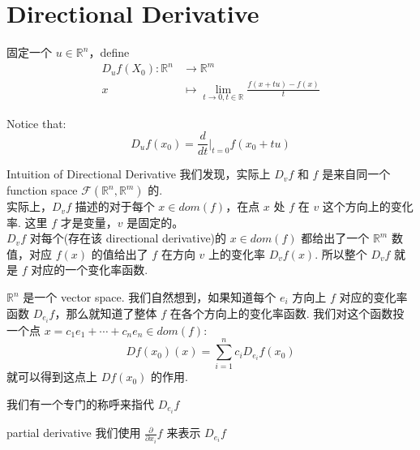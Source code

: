 \section{Directional Derivative}
\begin{definition}
    固定一个 $u \in \mathbb{R}^n$，define 
    \begin{align}
        D_u f(X_0) : \mathbb{R}^n & \rightarrow \mathbb{R}^m\\
        x & \mapsto \lim_{t\rightarrow 0, t\in \mathbb{R}} \frac{f(x + tu) - f(x)}{t}
    \end{align}

        Notice that:
        $$
        D_u f(x_0) = \frac{d}{dt}\bigg| _{t=0} f(x_0 + tu)
        $$
\end{definition}


\begin{proposition}{Intuition of Directional Derivative}
我们发现，实际上 $D_v f$ 和 $f$ 是来自同一个 function space $\mathcal{F}(\mathbb{R}^n, \mathbb{R}^m)$ 的.\\
实际上，$D_v f$ 描述的对于每个 $x \in dom(f)$，在点 $x$ 处 $f$ 在 $v$ 这个方向上的变化率. 这里 $f$ 才是变量，$v$ 是固定的。\\
$D_v f$ 对每个(存在该 directional derivative)的 $x \in dom(f)$ 都给出了一个 $\mathbb{R}^m$ 数值，对应 $f(x)$ 的值给出了 $f$ 在方向 $v$ 上的变化率 $D_v f(x)$. 所以整个 $D_v f$ 就是 $f$ 对应的一个变化率函数.
\end{proposition}

\begin{remark}
    $\mathbb{R}^n$ 是一个 vector space. 我们自然想到，如果知道每个 $e_i$ 方向上 $f$ 对应的变化率函数 $D_{e_i} f$，那么就知道了整体 $f$ 在各个方向上的变化率函数. 我们对这个函数投一个点 $x = c_1 e_1 + \cdots + c_n e_n \in dom(f)$:
    $$
    Df(x_0)(x) = \sum_{i=1}^n c_i D_{e_i} f(x_0) 
    $$
    就可以得到这点上 $Df(x_0)$ 的作用.
\end{remark}

\noindent 我们有一个专门的称呼来指代 $D_{e_i} f$
\begin{definition}{partial derivative} \label{partial derivative}
    我们使用 $\frac{\partial }{ \partial x_i} f$ 来表示 $D_{e_i} f$
\end{definition}

